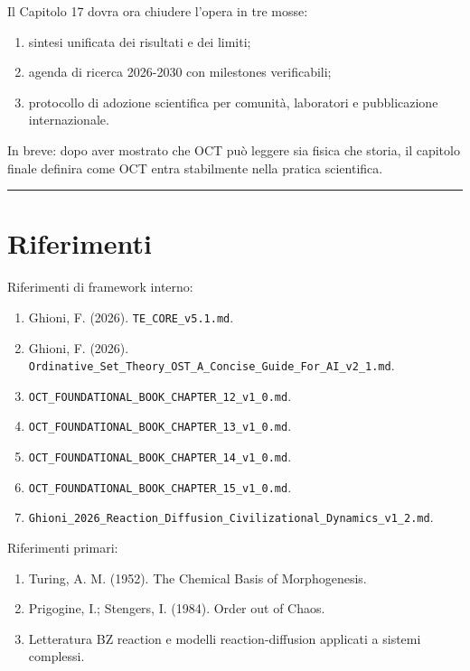 Il Capitolo 17 dovra ora chiudere l'opera in tre mosse:

\begin{enumerate}
\def\labelenumi{\arabic{enumi}.}
\tightlist
\item
  sintesi unificata dei risultati e dei limiti;
\item
  agenda di ricerca 2026-2030 con milestones verificabili;
\item
  protocollo di adozione scientifica per comunità, laboratori e pubblicazione internazionale.
\end{enumerate}

In breve: dopo aver mostrato che OCT può leggere sia fisica che storia, il capitolo finale definira come OCT entra stabilmente nella pratica scientifica.

\begin{center}\rule{0.5\linewidth}{0.5pt}\end{center}

\section{Riferimenti}

Riferimenti di framework interno:

\begin{enumerate}
\def\labelenumi{\arabic{enumi}.}
\tightlist
\item
  Ghioni, F. (2026). \texttt{TE\_CORE\_v5.1.md}.
\item
  Ghioni, F. (2026). \texttt{Ordinative\_Set\_Theory\_OST\_A\_Concise\_Guide\_For\_AI\_v2\_1.md}.
\item
  \texttt{OCT\_FOUNDATIONAL\_BOOK\_CHAPTER\_12\_v1\_0.md}.
\item
  \texttt{OCT\_FOUNDATIONAL\_BOOK\_CHAPTER\_13\_v1\_0.md}.
\item
  \texttt{OCT\_FOUNDATIONAL\_BOOK\_CHAPTER\_14\_v1\_0.md}.
\item
  \texttt{OCT\_FOUNDATIONAL\_BOOK\_CHAPTER\_15\_v1\_0.md}.
\item
  \texttt{Ghioni\_2026\_Reaction\_Diffusion\_Civilizational\_Dynamics\_v1\_2.md}.
\end{enumerate}

Riferimenti primari:

\begin{enumerate}
\def\labelenumi{\arabic{enumi}.}
\tightlist
\item
  Turing, A. M. (1952). The Chemical Basis of Morphogenesis.
\item
  Prigogine, I.; Stengers, I. (1984). Order out of Chaos.
\item
  Letteratura BZ reaction e modelli reaction-diffusion applicati a sistemi complessi.
\end{enumerate}
